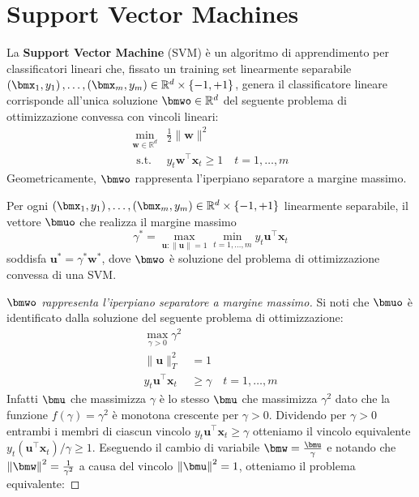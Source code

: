 \documentclass[\main/main.tex]{subfiles}
\begin{document}
\chapter{Support Vector Machines}
\begin{multicols}{2}
\begin{definition}
    La \textbf{Support Vector Machine} (SVM) è un algoritmo di apprendimento per classificatori lineari che, fissato un training set linearmente separabile \(\examples{m} \in \R^d \times \binaryImage\), genera il classificatore lineare corrisponde all'unica soluzione \(\bmwo \in \R^d\) del seguente problema di ottimizzazione convessa con vincoli lineari:
    \[
        \begin{array}{cl}{\min _{\boldsymbol{w} \in \mathbb{R}^{d}}} & {\frac{1}{2}\|\boldsymbol{w}\|^{2}} \\ {\text { s.t. }} & {y_{t} \boldsymbol{w}^{\top} \boldsymbol{x}_{t} \geq 1 \quad t=1, \ldots, m}\end{array}
    \]
    Geometricamente, \(\bmwo\) rappresenta l'iperpiano separatore a margine massimo.
\end{definition}
\begin{theorem}
    Per ogni \(\examples{m} \in \R^d \times \binaryImage\) linearmente separabile, il vettore \(\bmuo\) che realizza il margine massimo
    \[\gamma^{*}=\max _{\boldsymbol{u} :\|\boldsymbol{u}\|=1} \min _{t=1, \ldots, m} y_{t} \boldsymbol{u}^{\top} \boldsymbol{x}_{t}\]
    soddisfa \(\boldsymbol{u}^{*}=\gamma^{*} \boldsymbol{w}^{*}\), dove \(\bmwo\) è soluzione del problema di ottimizzazione convessa di una SVM.
\end{theorem}
\begin{proof}[\(\bmwo\) rappresenta l'iperpiano separatore a margine massimo]
    Si noti che \(\bmuo\) è identificato dalla soluzione del seguente problema di ottimizzazione:
    \begin{align*}
        \max _{\gamma>0} \gamma^{2}\\
        \|\boldsymbol{u}\|_{T}^{2}&=1 \\
        y_{t} \boldsymbol{u}^{\top} \boldsymbol{x}_{t} &\geq \gamma \quad t=1, \ldots, m
    \end{align*}
    Infatti \(\bmu\) che massimizza \(\gamma\) è lo stesso \(\bmu\) che massimizza \(\gamma^2\) dato che la funzione \(f(\gamma)=\gamma^{2}\) è monotona crescente per \(\gamma > 0\). Dividendo per \(\gamma > 0\) entrambi i membri di ciascun vincolo \(y_{t} \boldsymbol{u}^{\top} \boldsymbol{x}_{t} \geq \gamma\) otteniamo il vincolo equivalente \(y_{t}\left(\boldsymbol{u}^{\top} \boldsymbol{x}_{t}\right) / \gamma \geq 1\). Eseguendo il cambio di variabile \(\bmw = \frac{\bmu}{\gamma}\) e notando che \(\norm{\bmw}^2 = \frac{1}{\gamma^2}\) a causa del vincolo \(\norm{\bmu}^2=1\), otteniamo il problema equivalente:

\end{proof}
\end{multicols}
\end{document}
